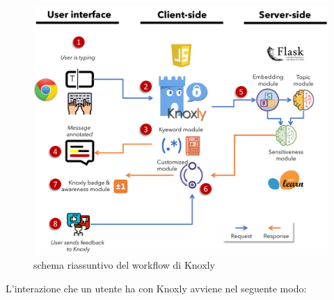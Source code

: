 \begin{figure}[h]
    \centering
    \includegraphics[width=15cm]{Figure/workflow.pdf}
    \caption{schema riassuntivo del workflow di Knoxly}
    \label{fig:workflow}
\end{figure}
\FloatBarrier
L'interazione che un utente ha con Knoxly avviene nel seguente modo:
